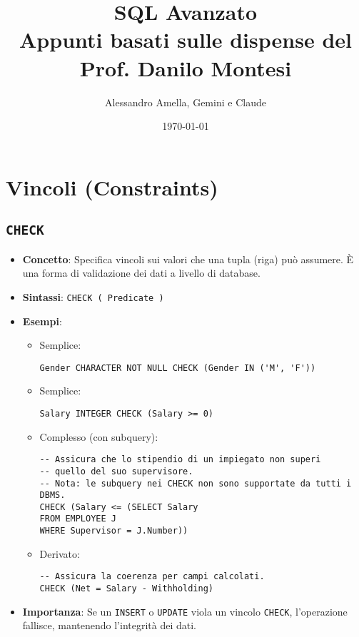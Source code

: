 

\usepackage{hyperref}

\title{SQL Avanzato\\
  \large Appunti basati sulle dispense del Prof. Danilo Montesi}
\author{Alessandro Amella, Gemini e Claude}
\date{\today}


	
	\maketitle
	\tableofcontents
	\newpage
	
	\section{Vincoli (Constraints)}
	
	\subsection{\texttt{CHECK}}
	\begin{itemize}
		\item \textbf{Concetto}: Specifica vincoli sui valori che una tupla (riga) può assumere. È una forma di validazione dei dati a livello di database.
		\item \textbf{Sintassi}: \texttt{CHECK ( Predicate )}
		\item \textbf{Esempi}:
		\begin{itemize}
			\item Semplice:
			\begin{verbatim}
Gender CHARACTER NOT NULL CHECK (Gender IN ('M', 'F'))
			\end{verbatim}
			\item Semplice:
			\begin{verbatim}
Salary INTEGER CHECK (Salary >= 0)
			\end{verbatim}
			\item Complesso (con subquery):
			\begin{verbatim}
-- Assicura che lo stipendio di un impiegato non superi
-- quello del suo supervisore.
-- Nota: le subquery nei CHECK non sono supportate da tutti i DBMS.
CHECK (Salary <= (SELECT Salary
FROM EMPLOYEE J
WHERE Supervisor = J.Number))
			\end{verbatim}
			\item Derivato:
			\begin{verbatim}
-- Assicura la coerenza per campi calcolati.
CHECK (Net = Salary - Withholding)
			\end{verbatim}
		\end{itemize}
		\item \textbf{Importanza}: Se un \texttt{INSERT} o \texttt{UPDATE} viola un vincolo \texttt{CHECK}, l'operazione fallisce, mantenendo l'integrità dei dati.
	\end{itemize}
	
